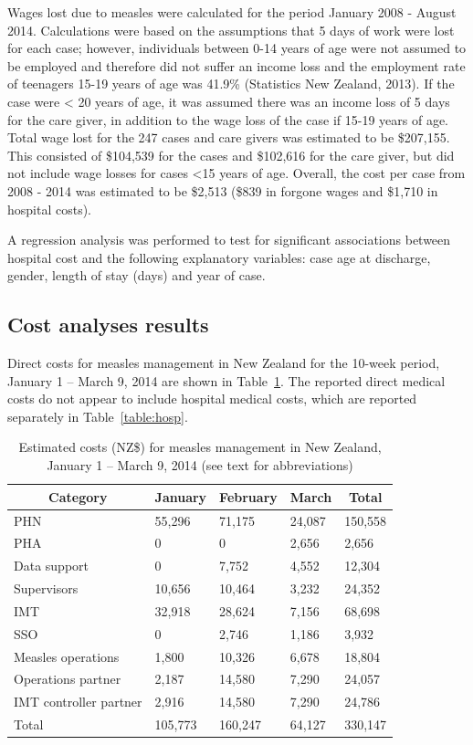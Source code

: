 \documentclass{article}
\begin{document}
\begin{itemize}
Wages lost due to measles were calculated for the period January 2008 - August 2014. Calculations were based on the assumptions that 5 days of work were lost for each case; however, individuals between 0-14 years of age were not assumed to be employed and therefore did not suffer an income loss and the employment rate of teenagers 15-19 years of age was 41.9\%  (Statistics New Zealand, 2013). If the case were < 20 years of age, it was assumed there was an income loss of 5 days for the care giver, in addition to the wage loss of the case if 15-19 years of age. Total wage lost for the 247 cases and care givers was estimated to be \$207,155. This consisted of \$104,539 for the cases and \$102,616 for the care giver, but did not include wage losses for cases <15 years of age. Overall, the cost per case from 2008 - 2014 was estimated to be \$2,513 (\$839 in forgone wages and \$1,710 in hospital costs).

A regression analysis was performed to test for significant associations between hospital cost and the following explanatory variables: case age at discharge, gender, length of stay (days) and year of case.

\subsection{Cost analyses results}

Direct costs for measles management in New Zealand for the 10-week period, January 1 -- March 9, 2014 are shown in  Table~\ref{table:direct}. The reported direct medical costs do not appear to include hospital medical costs, which are reported separately in Table~\ref{table:hosp}. 


\begin{table}
\caption{Estimated costs (NZ\$) for measles management in New Zealand, January 1 -- March 9, 2014 (see text for abbreviations)}
\begin{center}
\begin{tabular}{lllll}
\hline\hline
\multicolumn{1}{c}{Category}&\multicolumn{1}{c}{January}&\multicolumn{1}{c}{February}&\multicolumn{1}{c}{March}&\multicolumn{1}{c}{Total}\tabularnewline
\hline
PHN&55,296&71,175&24,087&150,558\tabularnewline
PHA&0&0&2,656&2,656\tabularnewline
Data support&0&7,752&4,552&12,304\tabularnewline
Supervisors&10,656&10,464&3,232&24,352\tabularnewline
IMT&32,918&28,624&7,156&68,698\tabularnewline
SSO&0&2,746&1,186&3,932\tabularnewline
Measles operations&1,800&10,326&6,678&18,804\tabularnewline
Operations partner&2,187&14,580&7,290&24,057\tabularnewline
IMT controller partner&2,916&14,580&7,290&24,786\tabularnewline
Total&105,773&160,247&64,127&330,147\tabularnewline
\hline
\end{tabular}\end{center}\label{table:direct}
\end{table}


\end{itemize}
\end{document}
